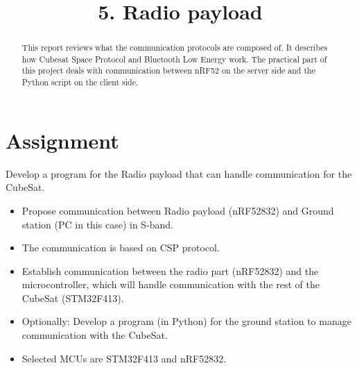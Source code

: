 \documentclass[conference]{IEEEtran}
\begin{document}
\title{5. Radio payload}

\author{
\and
{}
\and
{}
}

\maketitle

\begin{abstract}
This report reviews what the communication protocols are composed of. It describes how Cubesat Space Protocol and Bluetooth Low Energy work. The practical part of this project deals with communication between nRF52 on the server side and the Python script on the client side.
\end{abstract}


\section{Assignment}
Develop a program for the Radio payload that can handle communication for the CubeSat.
\begin{itemize}
\item Propose communication between Radio payload (nRF52832) and Ground station (PC in this case) in S-band.
\item The communication is based on CSP protocol.
\item Establish communication between the radio part (nRF52832) and the microcontroller, which will handle communication with the rest of the CubeSat (STM32F413).
\item Optionally: Develop a program (in Python) for the ground station to manage communication with the CubeSat.
\item Selected MCUs are STM32F413 and nRF52832.
\end{itemize}
\end{document}
